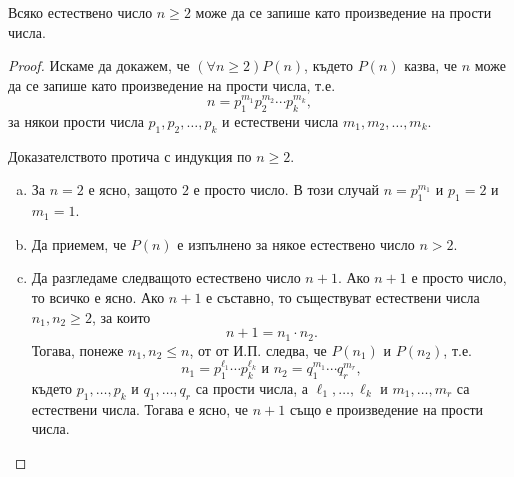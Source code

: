 \begin{problem}
  \label{prob:number-prod-prime}  
  Всяко естествено число $n \geq 2$ може да се запише като произведение на прости числа.
\end{problem}
\begin{proof}
  Искаме да докажем, че $(\forall n \geq 2)P(n)$, където $P(n)$ казва, че $n$ може да се запише като произведение на прости числа, т.е.
  \[n = p^{m_1}_1p^{m_2}_2\cdots p^{m_k}_k,\]
  за някои прости числа $p_1,p_2,\dots,p_k$ и естествени числа $m_1,m_2,\dots,m_k$.
  
  Доказателството протича с индукция по $n \geq 2$.
  \begin{enumerate}[a)]
  \item 
    За $n = 2$ е ясно, защото $2$ е просто число. В този случай $n = p^{m_1}_1$ и $p_1 = 2$ и $m_1 = 1$.
  \item
    Да приемем, че $P(n)$ е изпълнено за някое естествено число $n > 2$.
  \item
    Да разгледаме следващото естествено число $n+1$.
    Ако $n+1$ е просто число, то всичко е ясно.
    Ако $n+1$ е съставно, то съществуват естествени числа $n_1,n_2 \geq 2$, за които
    \[n + 1 = n_1\cdot n_2.\]
    Тогава, понеже $n_1,n_2 \leq n$, от от И.П. следва, че $P(n_1)$ и $P(n_2)$, т.е.
    \[n_1 = p^{\ell_1}_1\cdots p^{\ell_k}_k\text{ и }n_2 = q^{m_1}_1\cdots q^{m_r}_r,\]
    където $p_1,\dots,p_k$ и $q_1,\dots,q_r$ са прости числа, а $\ell_1,\dots,\ell_k$ и $m_1,\dots,m_r$ са естествени числа.
    Тогава е ясно, че $n+1$ също е произведение на прости числа.
  \end{enumerate}
\end{proof}

